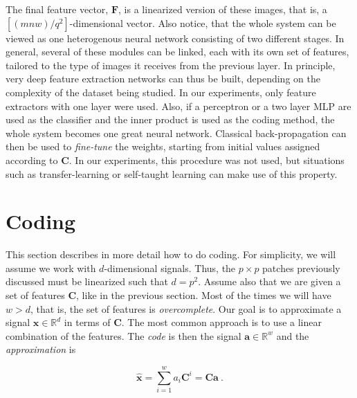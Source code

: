 \documentclass[runningheads,a4paper]{llncs}
\newcommand{\hctimes}[2]{{#1}\!\times\!{#2}}
\newcommand{\hcsignalspace}{\mathbb{R}^d}
\newcommand{\hcweightspace}{\mathbb{R}^w}
\begin{document}
The final feature vector, $\textbf{F}$, is a linearized version of these images, that is, a $\left[(mnw) / q^2\right]$-dimensional vector. Also notice, that the whole system can be viewed as one heterogenous neural network consisting of two different stages. In general, several of these modules can be linked, each with its own set of features, tailored to the type of images it receives from the previous layer. In principle, very deep feature extraction networks can thus be built, depending on the complexity of the dataset being studied. In our experiments, only feature extractors with one layer were used. Also, if a perceptron or a two layer MLP are used as the classifier and the inner product is used as the coding method, the whole system becomes one great neural network. Classical back-propagation can then be used to \emph{fine-tune} the weights, starting from initial values assigned according  to $\textbf{C}$. In our experiments, this procedure was not used, but situations such as transfer-learning or self-taught learning \cite{self-taught-learning} can make use of this property.

\section{Coding}

This section describes in more detail how to do coding. For simplicity, we will assume we work with $d$-dimensional signals. Thus, the $\hctimes{p}{p}$ patches previously discussed must be linearized such that $d = p^2$. Assume also that we are given a set of features $\textbf{C}$, like in the previous section. Most of the times we will have $w > d$, that is, the set of features is \emph{overcomplete}. Our goal is to approximate a signal $\textbf{x} \in \hcsignalspace$ in terms of $\textbf{C}$. The most common approach is to use a linear combination of the features. The \emph{code} is then the signal $\textbf{a} \in \hcweightspace$ and the \emph{approximation} is

\begin{equation}
\hat{\textbf{x}} = \sum_{i=1}^w {a_i \textbf{C}^i} = \textbf{C}\textbf{a}~.
\end{equation}
\end{document}
